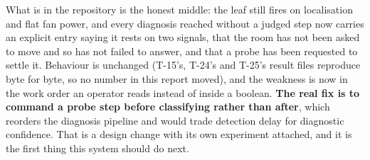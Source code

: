 What is in the repository is the honest middle: the leaf still fires on localisation and flat fan
power, and every diagnosis reached without a judged step now carries an explicit entry saying it
rests on two signals, that the room has not been asked to move and so has not failed to answer, and
that a probe has been requested to settle it. Behaviour is unchanged (T-15's, T-24's and T-25's
result files reproduce byte for byte, so no number in this report moved), and the weakness is now
in the work order an operator reads instead of inside a boolean. \textbf{The real fix is to command
a probe step before classifying rather than after}, which reorders the diagnosis pipeline and would
trade detection delay for diagnostic confidence. That is a design change with its own experiment
attached, and it is the first thing this system should do next.
